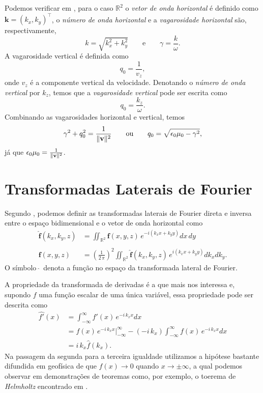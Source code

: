 Podemos verificar em \cite{White_Zhou_2006}, para o caso $\mathbb{R}^2$ o \textit{vetor de onda horizontal} \'e definido como $\mathbf{k}=(k_x,k_y)^\top$, o \textit{n\'umero de onda horizontal} e a \textit{vagarosidade horizontal} s\~ao, respectivamente,
\begin{equation}\label{eq.numero_onda_vagarozidade_horizontal}
k=\sqrt{k_x^2+k_y^2}\qquad\text{e}\qquad\gamma=\frac{k}{\omega}.
\end{equation}
A vagarosidade vertical \'e definida como
\begin{equation}
q_0=\frac{1}{v_z},
\end{equation}
onde $v_z$ \'e a componente vertical da velocidade. Denotando o \textit{n\'umero de onda vertical} por $k_z$, temos que a \textit{vagarosidade vertical} pode ser escrita como
\begin{equation}
q_0=\frac{k_z}{\omega}.
\end{equation}
Combinando as vagarosidades horizontal e vertical, temos
\begin{equation}\label{eq.vagarosidade_vertical}
\gamma^2+q_0^2=\frac{1}{\lVert\mathbf{v}\rVert^2}\qquad\text{ou}\qquad q_0=\sqrt{\epsilon_0\mu_0-\gamma^2},
\end{equation}
j\'a que $\epsilon_0\mu_0=\frac{1}{\lVert\mathbf{v}\rVert^2}$.

\section{Transformadas Laterais de Fourier}

Segundo \cite{butkov_88}, podemos definir as transformadas laterais de Fourier direta e inversa entre o espa\c{c}o bidimensional e o vetor de onda horizontal como
\begin{align}\label{eq.trans_fourier_1}
\mathbf{\widehat{f}}(k_x,k_y,z) &= \iint_{\mathbb{R}^2}\mathbf{f}(x,y,z)\,e^{-i(k_xx+k_yy)}dx\,dy\\\nonumber\\\label{eq.trans_fourier_2}
\mathbf{f}(x,y,z) &= \left(\frac{1}{2\,\pi}\right)^2\iint_{\mathbb{R}^2}\mathbf{\widehat{f}}(k_x,k_y,z)\,e^{i(k_xx+k_yy)}dk_xdk_y.
\end{align}
O s\'imbolo $\,\widehat{}\,$ denota a fun\c{c}\~ao no espa\c{c}o da transformada lateral de Fourier.

A propriedade da transformada de derivadas \'e a que mais nos interessa e, supondo $f$ uma fun\c{c}\~ao escalar de uma \'unica vari\'avel, essa propriedade pode ser descrita como  
\begin{align*}
\widehat{f'}(x)&=\int_{-\infty}^{\infty}f'(x)\,e^{-i\,k_xx}dx\\
&=f(x)\,e^{-i\,k_xx}|_{-\infty}^{\infty}-(-i\,k_x)\int_{-\infty}^{\infty}f(x)\,e^{-i\,k_xx}dx\\
&=i\,k_x\widehat{f}(k_x).
\end{align*}
Na passagem da segunda para a terceira igualdade utilizamos a hip\'otese bastante difundida em geof\'isica de que $f(x)\rightarrow 0$ quando $x \rightarrow \pm \infty $, a qual podemos observar em demonstra\c{c}\~oes de teoremas como, por exemplo, o toerema de \textit{Helmholtz} encontrado em \cite{griffiths}. 


